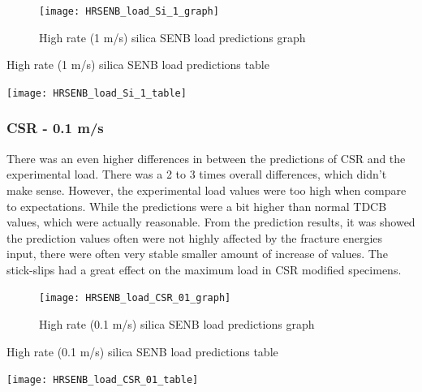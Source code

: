 \documentclass[numbers=noendperiod,chapterprefix=on]{icldt} %
\begin{document}
\begin{figure}[!hp]
   \centering
   \texttt{[image: HRSENB\_load\_Si\_1\_graph]}\label{HRSENB_load_Si_1_graph}
   \caption{High rate (1 m/s) silica SENB load predictions graph}
   \end{figure}
  \FloatBarrier
  
  \begin{table}
     \centering
     \caption{High rate (1 m/s) silica SENB load predictions table}\label{HRSENB_load_Si_1_table}
     \texttt{[image: HRSENB\_load\_Si\_1\_table]}
     \end{table}
     \FloatBarrier      

\subsubsection{CSR - 0.1 m/s}
There was an even higher differences in between the predictions of CSR and the experimental load. There was a 2 to 3 times overall differences, which didn't make sense. However, the experimental load values were too high when compare to expectations. While the predictions were a bit higher than normal TDCB values, which were actually reasonable. From the prediction results, it was showed the prediction values often were not highly affected by the fracture energies input, there were often very stable smaller amount of increase of values. The stick-slips had a great effect on the maximum load in CSR modified specimens.

\begin{figure}[!hp]
   \centering
   \texttt{[image: HRSENB\_load\_CSR\_01\_graph]}\label{HRSENB_load_CSR_01_graph}
   \caption{High rate (0.1 m/s) silica SENB load predictions graph}
   \end{figure}
  \FloatBarrier
  
  \begin{table}
     \centering
     \caption{High rate (0.1 m/s) silica SENB load predictions table}\label{HRSENB_load_CSR_01_table}
     \texttt{[image: HRSENB\_load\_CSR\_01\_table]}
     \end{table}
     \FloatBarrier      
\end{document}
